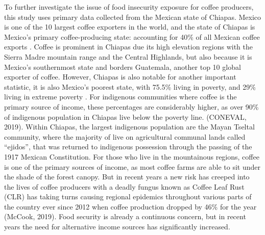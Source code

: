 \documentclass[../main.tex]{subfiles}
\begin{document}
To further investigate the issue of food insecurity exposure for coffee producers, this study uses primary data collected from the Mexican state of Chiapas. Mexico is one of the 10 largest coffee exporters in the world, and the state of Chiapas is Mexico’s primary coffee-producing state: accounting for 40\% of all Mexican coffee exports \parencite{siap_servicio_2022}. Coffee is prominent in Chiapas due its high elevation regions with the Sierra Madre mountain range and the Central Highlands, but also because it is Mexico’s southernmost state and borders Guatemala, another top 10 global exporter of coffee. However, Chiapas is also notable for another important statistic, it is also Mexico’s poorest state, with 75.5\% living in poverty, and 29\% living in extreme poverty \parencite{coneval_consejo_2020}. For indigenous communities where coffee is the primary source of income, these percentages are considerably higher, as over 90\% of indigenous population in Chiapas live below the poverty line. (CONEVAL, 2019). Within Chiapas, the largest indigenous population are the Mayan Tseltal community,  where the majority of live on agricultural communal lands called “ejidos”, that was returned to indigenous possession through the passing of the 1917 Mexican Constitution. For those who live in the mountainous regions, coffee is one of the primary sources of income, as most coffee farms are able to sit under the shade of the forest canopy. But in recent years a new risk has creeped into the lives of coffee producers with a deadly fungus known as Coffee Leaf Rust (CLR)  has taking turns causing regional epidemics throughout various parts of the country ever since 2012 when coffee production dropped by 46\% for the year (McCook, 2019). Food security is already a continuous concern, but in recent years the need for alternative income sources has significantly increased. 
\end{document}
